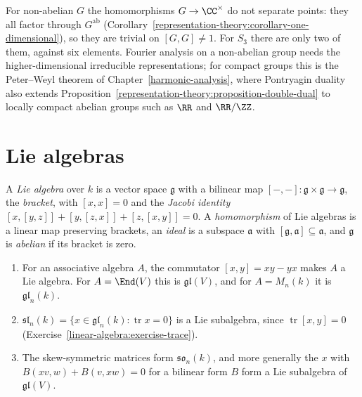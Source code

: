 \begin{counterexample}\label{representation-theory:counterexample-dual-nonabelian}
For non-abelian $G$ the homomorphisms $G \to \CC^\times$ do not separate points: they all factor through $G^{\mathrm{ab}}$ (Corollary~\ref{representation-theory:corollary-one-dimensional}), so they
are trivial on $[G, G] \neq 1$. For $S_3$ there are only two of them, against six elements. Fourier analysis on a non-abelian group needs the higher-dimensional irreducible representations; for compact
groups this is the Peter--Weyl theorem of Chapter~\ref{harmonic-analysis}, where Pontryagin duality also extends Proposition~\ref{representation-theory:proposition-double-dual} to locally compact abelian
groups such as $\RR$ and $\RR/\ZZ$.
\end{counterexample}

\section{Lie algebras}\label{representation-theory:section-lie-algebras}

\begin{definition}\label{representation-theory:definition-lie-algebra}
A \emph{Lie algebra} over $k$ is a vector space $\mathfrak{g}$ with a bilinear map
$[-, -] \colon \mathfrak{g} \times \mathfrak{g} \to \mathfrak{g}$, the \emph{bracket}, with $[x, x] = 0$ and the
\emph{Jacobi identity} $[x, [y, z]] + [y, [z, x]] + [z, [x, y]] = 0$. A \emph{homomorphism} of Lie algebras is a
linear map preserving brackets, an \emph{ideal} is a subspace $\mathfrak{a}$ with
$[\mathfrak{g}, \mathfrak{a}] \subseteq \mathfrak{a}$, and $\mathfrak{g}$ is \emph{abelian} if its bracket is zero.
\end{definition}

\begin{example}\label{representation-theory:example-lie-algebras}
\begin{enumerate}
\item For an associative algebra $A$, the commutator $[x, y] = xy - yx$ makes $A$ a Lie algebra. For $A = \End(V)$
this is $\mathfrak{gl}(V)$, and for $A = M_n(k)$ it is $\mathfrak{gl}_n(k)$.
\item $\mathfrak{sl}_n(k) = \{x \in \mathfrak{gl}_n(k) : \operatorname{tr} x = 0\}$ is a Lie subalgebra, since
$\operatorname{tr}[x, y] = 0$ (Exercise~\ref{linear-algebra:exercise-trace}).
\item The skew-symmetric matrices form $\mathfrak{so}_n(k)$, and more generally the $x$ with $B(xv, w) + B(v, xw) = 0$
for a bilinear form $B$ form a Lie subalgebra of $\mathfrak{gl}(V)$.
\end{enumerate}
\end{example}

